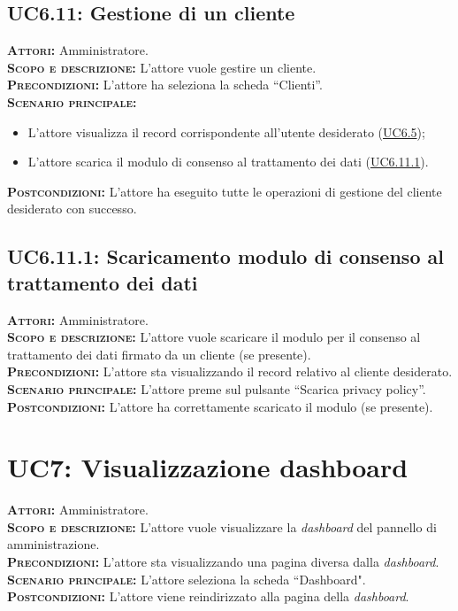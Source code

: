 \subsection{UC6.11: Gestione di un cliente}
\label{sec:UC611}
\textsc{\textbf{Attori:}} Amministratore.\\
\textsc{\textbf{Scopo e descrizione:}} L'attore vuole gestire un cliente.\\
\textsc{\textsc{\textbf{Precondizioni:}}} L'attore ha seleziona la scheda ``Clienti''.\\
\textsc{\textbf{Scenario principale:}} 
\begin{itemize}
    \item L'attore visualizza il record corrispondente all'utente desiderato (\hyperref[sec:UC65]{UC6.5});
    \item L'attore scarica il modulo di consenso al trattamento dei dati (\hyperref[sec:UC6101]{UC6.11.1}).
\end{itemize}
\textsc{\textbf{Postcondizioni:}} L'attore ha eseguito tutte le operazioni di gestione del cliente desiderato con successo.

\subsection{UC6.11.1: Scaricamento modulo di consenso al trattamento dei dati}
\label{sec:UC6111}
\textsc{\textbf{Attori:}} Amministratore.\\
\textsc{\textbf{Scopo e descrizione:}} L'attore vuole scaricare il modulo per il consenso al trattamento dei dati firmato da un cliente (se presente).\\
\textsc{\textsc{\textbf{Precondizioni:}}} L'attore sta visualizzando il record relativo al cliente desiderato.\\
\textsc{\textbf{Scenario principale:}} L'attore preme sul pulsante ``Scarica privacy policy''.
\textsc{\textbf{Postcondizioni:}} L'attore ha correttamente scaricato il modulo (se presente).

\section{UC7: Visualizzazione dashboard}
\label{sec:UC7}
\textsc{\textbf{Attori:}} Amministratore.\\
\textsc{\textbf{Scopo e descrizione:}} L'attore vuole visualizzare la \textit{dashboard} del pannello di amministrazione.\\
\textsc{\textsc{\textbf{Precondizioni:}}} L'attore sta visualizzando una pagina diversa dalla \textit{dashboard}.\\
\textsc{\textbf{Scenario principale:}} L'attore seleziona la scheda ``Dashboard".\\
\textsc{\textbf{Postcondizioni:}} L'attore viene reindirizzato alla pagina della \textit{dashboard}.

